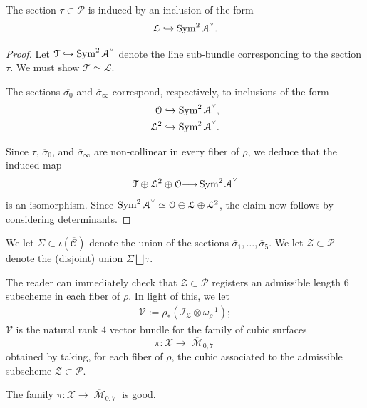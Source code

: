 \documentclass[12pt,reqno]{amsart}
\DeclareMathOperator{\M}{\mathcal{M}}
\renewcommand{\to}{{\longrightarrow}}
\numberwithin{equation}{section}
\renewcommand{\O}{\mathcal O}
\newcommand{\V}{\mathcal V}
\newcommand{\cP}{\mathcal P}
\newcommand{\cX}{\mathcal{X}}
\newcommand{\smvee}{\raise0.5ex\hbox{$\scriptscriptstyle\vee$}}
\renewcommand {\o}[1]{\overline{#1}}
\begin{document}
\begin{lemma}
  \label{lemma:tau}
  The section $\tau \subset \cP$ is induced by an inclusion of the
  form
  $${\mathcal{L}} \hookrightarrow \Sym^{2} \mathcal{A}^{\smvee}.$$
\end{lemma}

\begin{proof}
  Let $\mathcal{T} \hookrightarrow \Sym^{2} \mathcal{A}^{\smvee}$
  denote the line sub-bundle corresponding to the section $\tau$. We
  must show $\mathcal{T} \simeq \mathcal{L}$.

  The sections
  $\o{\sigma_{0}}$ and $\o{\sigma}_{\infty}$ correspond, respectively,
  to inclusions of the form
  \begin{align*}
    \O \hookrightarrow \Sym^{2} \mathcal{A}^{\smvee}, \\
    \mathcal{L}^{2} \hookrightarrow \Sym^{2} \mathcal{A}^{\smvee}. \\
  \end{align*}

  Since $\tau$, $\o{\sigma}_{0}$, and $\o{\sigma}_{\infty}$ are
  non-collinear in every fiber of $\rho$, we deduce that the induced
  map
  $$\mathcal{T} \oplus \mathcal{L}^{2} \oplus \O \to \Sym^{2}
  \mathcal{A}^{\smvee}$$ is an isomorphism.  Since
  $\Sym^{2} \mathcal{A}^{\smvee} \simeq \O \oplus \mathcal{L} \oplus
  \mathcal{L}^{2}$, the claim now follows by considering determinants.
\end{proof}


\begin{definition}
  \label{def:ZB2} We let $\Sigma \subset \iota(\o{\mathcal{C}})$
  denote the union of the sections
  $\o{\sigma}_{1}, \dots, \o{\sigma}_{5}$.  We let
  $\mathcal{Z} \subset \cP$ denote the (disjoint) union
  $\Sigma \bigsqcup \tau$.
\end{definition}

The reader can immediately check that $\mathcal{Z} \subset \cP$
registers an admissible length $6$ subscheme in each fiber of
$\rho$. In light of this, we let
\begin{align}
  \label{eq:VB2}
  \mathcal{V} := \rho_{*}(\mathcal{I}_{\mathcal{Z}} \otimes \omega_{\rho}^{-1});
\end{align}
$\V$ is the natural rank $4$ vector bundle for the family of cubic
surfaces $$\pi: \cX \to \o{\M}_{0,7}$$ obtained by taking, for each
fiber of $\rho$, the cubic associated to the admissible subscheme
$\mathcal{Z} \subset \cP$.

\begin{proposition}
  \label{prop:goodnessB2} The family $\pi: \cX \to \o{\M}_{0,7}$ is
  good.
\end{proposition}
\end{document}
